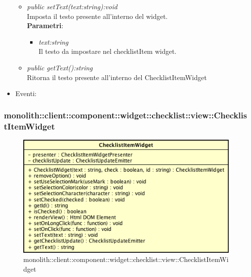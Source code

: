 \begin{itemize}
\begin{itemize}
	\item \textit{public setText(text:string):void}\\
	Imposta il testo presente all'interno del widget.
		\\ \textbf{Parametri}: \begin{itemize}
		\item \textit{text:string}\\
		Il testo da impostare nel checklistItem widget.
		\end{itemize}
	\item \textit{public getText():string}\\
	Ritorna il testo presente all'interno del ChecklistItemWidget
	\end{itemize}
\item{Eventi}:
\end{itemize}

\subsubsection{monolith::client::component::widget::checklist::view::ChecklistItemWidget}

\label{monolith::client::component::widget::checklist::view::ChecklistItemWidget}
\begin{figure}[H]
	\centering
	\includegraphics[scale=0.5]{Sezioni/SottosezioniST/img/ChecklistItemWidget.png}
	\caption{monolith::client::component::widget::checklist::view::ChecklistItemWidget}
\end{figure}

